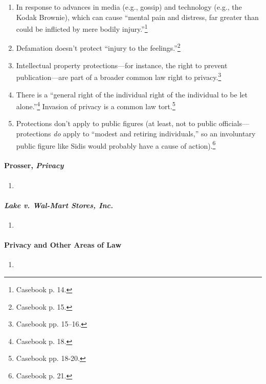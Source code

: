 \begin{enumerate}
    \item In response to advances in media (e.g., gossip) and technology 
    (e.g., the Kodak Brownie), which can cause ``mental pain and distress, far 
    greater than could be inflicted by mere bodily injury.''\footnote{Casebook 
    p. 14.}
    \item Defamation doesn't protect ``injury to the 
    feelings.''\footnote{Casebook p. 15.}
    \item Intellectual property protections---for instance, the right to 
    prevent publication---are part of a broader common law right to 
    privacy.\footnote{Casebook pp. 15--16.}
    \item There is a ``general right of the individual right of the individual 
    to be let alone.''\footnote{Casebook p. 18.} Invasion of privacy is a 
    common law tort.\footnote{Casebook pp. 18-20.}
    \item Protections don't apply to public figures (at least, not to public 
    officials---protections \emph{do} apply to ``modest and retiring 
    individuals,'' so an involuntary public figure like Sidis would probably 
    have a cause of action).\footnote{Casebook p. 21.}
\end{enumerate}

\paragraph{Prosser, \emph{Privacy}}

\begin{enumerate}
    \item %
\end{enumerate}

\paragraph{\emph{Lake v. Wal-Mart Stores, Inc.}}

\begin{enumerate}
    \item %
\end{enumerate}

\paragraph{Privacy and Other Areas of Law}

\begin{enumerate}
    \item %
\end{enumerate}

